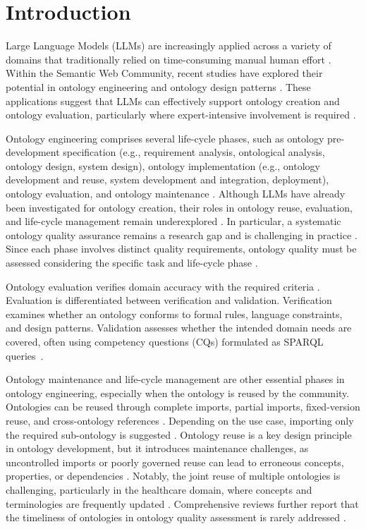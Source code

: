 \documentclass[
]{ceurart}
\begin{document}
\section{Introduction}
Large Language Models (LLMs) are increasingly applied across a variety of domains that traditionally relied on time-consuming manual human effort \cite{Li2025,li2025large,Tsaneva2024}. Within the Semantic Web Community, recent studies have explored their potential in ontology engineering and ontology design patterns \cite{li2025large}. These applications suggest that LLMs can effectively support ontology creation and ontology evaluation, particularly where expert-intensive involvement is required \cite{li2025large,Tsaneva2024}. 

Ontology engineering comprises several life-cycle phases, such as ontology pre-development specification (e.g., requirement analysis, ontological analysis, ontology design, system design), ontology implementation (e.g., ontology development and reuse, system development and integration, deployment), ontology evaluation, and ontology maintenance \cite{Wilson2022, li2025large}. Although LLMs have already been investigated for ontology creation, their roles in ontology reuse, evaluation, and life-cycle management remain underexplored \cite{Tsaneva2024}. In particular, a systematic ontology quality assurance remains a research gap and is challenging in practice \cite{Sowiski2022}. Since each phase involves distinct quality requirements, ontology quality must be assessed considering the specific task and life-cycle phase \cite{Wilson2022}. 

Ontology evaluation verifies domain accuracy with the required criteria \cite{Sammi2025}. Evaluation is differentiated between verification and validation. Verification examines whether an ontology conforms to formal rules, language constraints, and design patterns. Validation assesses whether the intended domain needs are covered, often using competency questions (CQs) formulated as SPARQL queries~\cite{Sammi2025,PovedaVillaln2012OOPS,Lippolis2025, burbach2025aiship}. 

Ontology maintenance and life-cycle management are other essential phases in ontology engineering, especially when the ontology is reused by the community. Ontologies can be reused through complete imports, partial imports, fixed-version reuse, and cross-ontology references \cite{Sowiski2022,Halper2023}. Depending on the use case, importing only the required sub-ontology is suggested \cite{Halper2023}. Ontology reuse is a key design principle in ontology development, but it introduces maintenance challenges, as uncontrolled imports or poorly governed reuse can lead to erroneous concepts, properties, or dependencies \cite{Halper2023}. Notably, the joint reuse of multiple ontologies is challenging, particularly in the healthcare domain, where concepts and terminologies are frequently updated \cite{Sowiski2022, Bernab2023}. Comprehensive reviews further report that the timeliness of ontologies in ontology quality assessment is rarely addressed \cite{Wilson2022}. 
\end{document}
